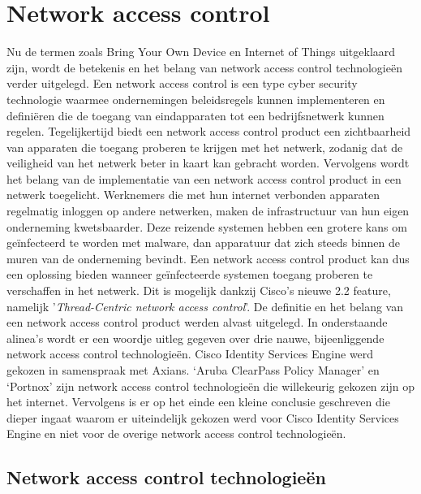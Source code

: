 \section{Network access control}
Nu de termen zoals Bring Your Own Device en Internet of Things uitgeklaard zijn, wordt de betekenis en het belang van network access control technologieën verder uitgelegd.
\newline
\newline 
Een network access control is een type cyber security technologie waarmee ondernemingen beleidsregels kunnen implementeren en definiëren die de toegang van eindapparaten tot een bedrijfsnetwerk kunnen regelen. Tegelijkertijd biedt een network access control product een zichtbaarheid van apparaten die toegang proberen te krijgen met het netwerk, zodanig dat de veiligheid van het netwerk beter in kaart kan gebracht worden. Vervolgens wordt het belang van de implementatie van een network access control product in een netwerk toegelicht.
\newline
\newline 
Werknemers die met hun internet verbonden apparaten regelmatig inloggen op andere netwerken, maken de infrastructuur van hun eigen onderneming kwetsbaarder. Deze reizende systemen hebben een grotere kans om geïnfecteerd te worden met malware, dan apparatuur dat zich steeds binnen de muren van de onderneming bevindt. Een network access control product kan dus een oplossing bieden wanneer geïnfecteerde systemen toegang proberen te verschaffen in het netwerk. Dit is mogelijk dankzij Cisco's nieuwe 2.2 feature, namelijk '\textit{Thread-Centric network access control}'. 
\newline
\newline 
De definitie en het belang van een network access control product werden alvast uitgelegd. In onderstaande alinea’s wordt er een woordje uitleg gegeven over drie nauwe, bijeenliggende network access control technologieën. Cisco Identity Services Engine werd gekozen in samenspraak met Axians. ‘Aruba ClearPass Policy Manager’ en ‘Portnox’ zijn network access control technologieën die willekeurig gekozen zijn op het internet. Vervolgens is er op het einde een kleine conclusie geschreven die dieper ingaat waarom er uiteindelijk gekozen werd voor Cisco Identity Services Engine en niet voor de overige network access control technologieën.

\subsection{Network access control technologieën}
